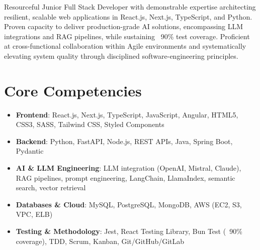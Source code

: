 \documentclass[11pt,a4paper,sans]{moderncv}
\begin{document}
\makecvtitle


\vspace{6pt}
\small{Resourceful Junior Full Stack Developer with demonstrable expertise architecting resilient, scalable web applications in React.js, Next.js, TypeScript, and Python. Proven capacity to deliver production-grade AI solutions, encompassing LLM integrations and RAG pipelines, while sustaining ~90\% test coverage. Proficient at cross-functional collaboration within Agile environments and systematically elevating system quality through disciplined software-engineering principles.}


\section{Core Competencies}
\vspace{1pt}
\begin{itemize}

\item \textbf{Frontend}: React.js, Next.js, TypeScript, JavaScript, Angular, HTML5, CSS3, SASS, Tailwind CSS, Styled Components

\item \textbf{Backend}: Python, FastAPI, Node.js, REST APIs, Java, Spring Boot, Pydantic

\item \textbf{AI \& LLM Engineering}: LLM integration (OpenAI, Mistral, Claude), RAG pipelines, prompt engineering, LangChain, LlamaIndex, semantic search, vector retrieval

\item \textbf{Databases \& Cloud}: MySQL, PostgreSQL, MongoDB, AWS (EC2, S3, VPC, ELB)

\item \textbf{Testing \& Methodology}: Jest, React Testing Library, Bun Test (~90\% coverage), TDD, Scrum, Kanban, Git/GitHub/GitLab

\end{itemize}

\end{document}
